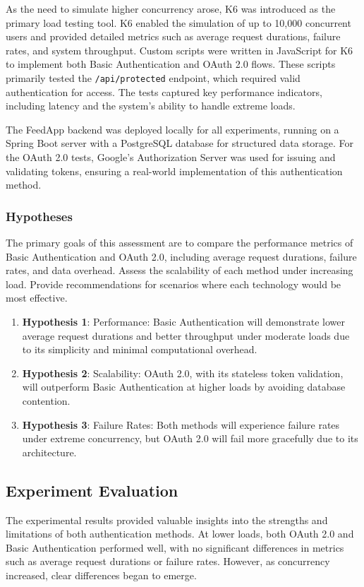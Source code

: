 As the need to simulate higher concurrency arose, K6 was introduced as the primary load testing tool. K6 enabled the simulation of up to 10,000 concurrent users and provided detailed metrics such as average request durations, failure rates, and system throughput. Custom scripts were written in JavaScript for K6 to implement both Basic Authentication and OAuth 2.0 flows. These scripts primarily tested the \texttt{/api/protected} endpoint, which required valid authentication for access. The tests captured key performance indicators, including latency and the system’s ability to handle extreme loads.

The FeedApp backend was deployed locally for all experiments, running on a Spring Boot server with a PostgreSQL database for structured data storage. For the OAuth 2.0 tests, Google’s Authorization Server was used for issuing and validating tokens, ensuring a real-world implementation of this authentication method. 

\subsubsection*{Hypotheses}
The primary goals of this assessment are to compare the performance metrics of Basic Authentication and OAuth 2.0, including average request durations, failure rates, and data overhead. Assess the scalability of each method under increasing load. Provide recommendations for scenarios where each technology would be most effective.

\begin{enumerate}
    \item \textbf{Hypothesis 1}: Performance: Basic Authentication will demonstrate lower average request durations and better throughput under moderate loads due to its simplicity and minimal computational overhead.
    \item \textbf{Hypothesis 2}: Scalability: OAuth 2.0, with its stateless token validation, will outperform Basic Authentication at higher loads by avoiding database contention.
    \item \textbf{Hypothesis 3}: Failure Rates: Both methods will experience failure rates under extreme concurrency, but OAuth 2.0 will fail more gracefully due to its architecture.
\end{enumerate}

\subsection{Experiment Evaluation}
The experimental results provided valuable insights into the strengths and limitations of both authentication methods. At lower loads, both OAuth 2.0 and Basic Authentication performed well, with no significant differences in metrics such as average request durations or failure rates. However, as concurrency increased, clear differences began to emerge.

